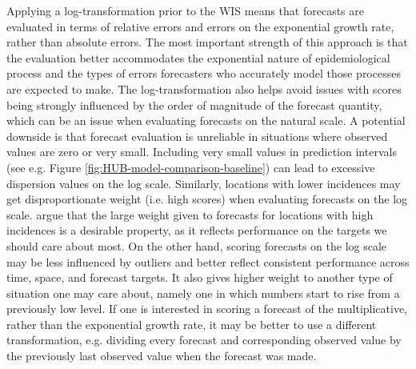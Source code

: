 \documentclass{article}
\begin{document}
Applying a log-transformation prior to the WIS means that forecasts are evaluated in terms of relative errors and errors on the exponential growth rate, rather than absolute errors. The most important strength of this approach is that the evaluation better accommodates the exponential nature of epidemiological process and the types of errors forecasters who accurately model those processes are expected to make. The log-transformation also helps avoid issues with scores being strongly influenced by the order of magnitude of the forecast quantity, which can be an issue when evaluating forecasts on the natural scale. 
A potential downside is that forecast evaluation is unreliable in situations where observed values are zero or very small. Including very small values in prediction intervals (see e.g. Figure \ref{fig:HUB-model-comparison-baseline}) can lead to excessive dispersion values on the log scale. 
Similarly, locations with lower incidences may get disproportionate weight (i.e. high scores) when evaluating forecasts on the log scale. \cite{bracherEvaluatingEpidemicForecasts2021} argue that the large weight given to forecasts for locations with high incidences is a desirable property, as it reflects performance on the targets we should care about most. On the other hand, scoring forecasts on the log scale may be less influenced by outliers and better reflect consistent performance across time, space, and forecast targets. It also gives higher weight to another type of situation one may care about, namely one in which numbers start to rise from a previously low level. 
If one is interested in scoring a forecast of the multiplicative, rather than the exponential  growth rate, it may be better to use a different transformation, e.g. dividing every forecast and corresponding observed value by the previously last observed value when the forecast was made. 
\end{document}

